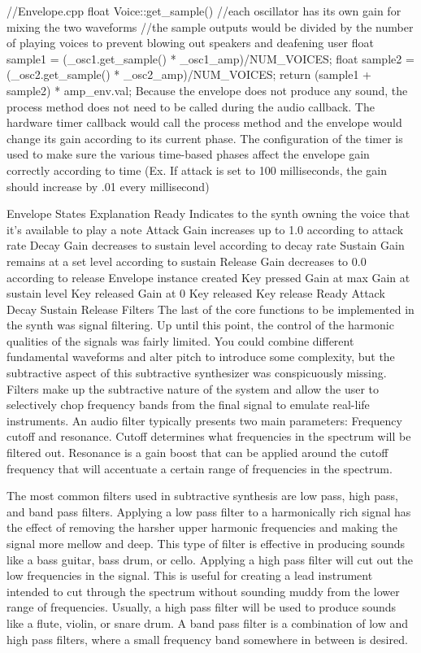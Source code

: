 \documentclass[acmlarge,screen]{acmart}
\begin{document}
//Envelope.cpp
float Voice::get_sample()
{   
	//each oscillator has its own gain for mixing the two waveforms
	//the sample outputs would be divided by the number of playing voices to prevent blowing out speakers and deafening user
	float sample1 = (_osc1.get_sample() * _osc1_amp)/NUM_VOICES; 
	float sample2 = (_osc2.get_sample() * _osc2_amp)/NUM_VOICES;
	return (sample1 + sample2) * amp_env.val;
}
Because the envelope does not produce any sound, the process method does not need to be called during the audio callback. The hardware timer callback would call the process method and the envelope would change its gain according to its current phase. The configuration of the timer is used to make sure the various time-based phases affect the envelope gain correctly according to time (Ex. If attack is set to 100 milliseconds, the gain should increase by .01 every millisecond)

Envelope States	Explanation
Ready	Indicates to the synth owning the voice that it's available to play a note
Attack	Gain increases up to 1.0 according to attack rate
Decay	Gain decreases to sustain level according to decay rate
Sustain	Gain remains at a set level according to sustain
Release	Gain decreases to 0.0 according to release
Envelope instance created
Key pressed
Gain at max
Gain at sustain level
Key released
Gain at 0
Key released
Key release
Ready
Attack
Decay
Sustain
Release
Filters
The last of the core functions to be implemented in the synth was signal filtering. Up until this point, the control of the harmonic qualities of the signals was fairly limited. You could combine different fundamental waveforms and alter pitch to introduce some complexity, but the subtractive aspect of this subtractive synthesizer was conspicuously missing. Filters make up the subtractive nature of the system and allow the user to selectively chop frequency bands from the final signal to emulate real-life instruments. An audio filter typically presents two main parameters: Frequency cutoff and resonance. Cutoff determines what frequencies in the spectrum will be filtered out. Resonance is a gain boost that can be applied around the cutoff frequency that will accentuate a certain range of frequencies in the spectrum.

The most common filters used in subtractive synthesis are low pass, high pass, and band pass filters. Applying a low pass filter to a harmonically rich signal has the effect of removing the harsher upper harmonic frequencies and making the signal more mellow and deep. This type of filter is effective in producing sounds like a bass guitar, bass drum, or cello. Applying a high pass filter will cut out the low frequencies in the signal. This is useful for creating a lead instrument intended to cut through the spectrum without sounding muddy from the lower range of frequencies. Usually, a high pass filter will be used to produce sounds like a flute, violin, or snare drum. A band pass filter is a combination of low and high pass filters, where a small frequency band somewhere in between is desired.
\end{document}
